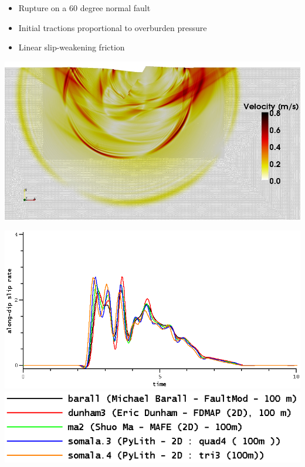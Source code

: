 \documentclass[pdftex,cig,slideColor]{pp4slides}
\begin{document}
  \begin{itemize}
  \item Rupture on a 60 degree normal fault
  \item Initial tractions proportional to overburden pressure
  \item Linear slip-weakening friction
  \end{itemize}
  
  \vfill
  \begin{center}
    \includegraphics[scale=0.6]{figs/tpv210-2d_soln}
  \end{center}
  

  \vfill
  \begin{center}
    \includegraphics[scale=0.6]{figs/tpv210-2d}
    \includegraphics[scale=0.6]{figs/tpv210-2d_legend}
  \end{center}
  \vfill
  
\end{document}
